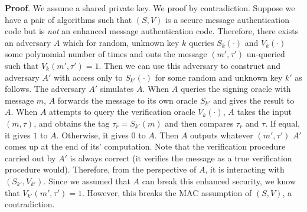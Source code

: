 \documentclass{article}
\begin{document}
\begin{enumerate}[,start=4]
\begin{mdbmarginx}{1ex}{0pt}{1ex}{0pt}%
\noindent{}\textbf{Proof}.  We assume a shared private key. 
We proof by contradiction. Suppose we have a pair of algorithms such that $(S,V)$ is a secure
message authentication code but is \emph{not} an enhanced message authentication code. Therefore,
there exists an adversary $A$ which for random, unknown key $k$
queries $S_k(\cdot)$ and $V_k(\cdot)$ some polynomial
number of times and outs the message $(m',\tau')$ un-queried such that $V_k(m',\tau') = 1$. Then we
can use this adversary to construct and adversary $A'$ with access only to $S_{k'}(\cdot)$
for some random and unknown key $k'$ as follows.
The adversary $A'$ simulates $A$. When $A$ queries the signing oracle with message $m$, $A$ forwards
the message to its own oracle $S_{k'}$ and gives the result to $A$. When $A$ attempts to query
the verification oracle $V_k(\cdot)$, $A$ takes the input $(m,\tau)$, and obtains the tag
$\tau_r = S_{k'}(m)$ and then compares $\tau_r$ and $\tau$. If equal, it gives $1$ to $A$. Otherwise,
it gives $0$ to $A$. Then $A$ outputs whatever $(m',\tau')$ $A'$ comes up at the end of its' 
computation. Note that the verification procedure carried out by $A'$ is always correct (it
verifies the message as a true verification procedure would). Therefore, from the perspective of
$A$, it is interacting with $(S_{k'}, V_{k'})$. Since we assumed that $A$ can break this 
enhanced security, we know that $V_{k'}(m',\tau') = 1$. However, this breaks the MAC assumption
of $(S,V)$, a contradiction.%
\end{mdbmarginx}%

\mdfloatright{\ensuremath{\Box}}%
\end{enumerate}%
\end{document}
